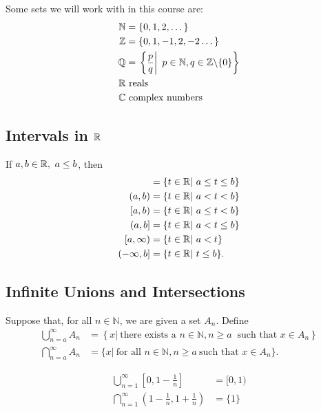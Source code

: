 Some sets we will work with in this course are:
\begin{align*}
\mathbb N & = \{0, 1, 2, \dots \} \\
\mathbb Z & = \{0, 1, -1, 2, -2 \dots \} \\
\mathbb Q & = \left. \left\{ \frac p q \right| ~ p \in \mathbb N, q \in \mathbb Z \backslash \{0\} \right\} \\
\mathbb R & ~\text{reals} \\
\mathbb C & ~\text{complex numbers}
\end{align*}


\subsection{Intervals in $\mathbb R$}
\begin{df}
If $a,b \in \mathbb R, ~a \le b$, then
\begin{align*}
[a,b] & = \{ t \in \R| ~a \le t \le b \} \\
(a,b) & = \{ t \in \R| ~a < t < b \} \\
[a,b) & = \{ t \in \R| ~a \le t < b \} \\
(a,b] & = \{ t \in \R| ~a < t \le b \} \\
[a, \infty) & = \{ t \in \R| ~a < t \} \\
( -\infty ,b] & = \{ t \in \R| ~t \le b \}.
\end{align*}
\end{df}


\subsection{Infinite Unions and Intersections}
\begin{df}
Suppose that, for all $n \in \mathbb N$, we are given a set $A_n$. Define
\begin{align*}
\bigcup_{n=a}^\infty A_n & = \left\{ x | ~\text{there exists a }n\in \mathbb N, n\ge a ~\text{ such that } x \in A_n \right\} \\
\bigcap_{n=a}^\infty A_n & = \{ x | ~\text{for all }n\in \mathbb N, n\ge a ~ \text{such that } x \in A_n \} .
\end{align*}
\end{df}

\begin{ex}
\begin{align*}
\bigcup_{n=1}^\infty \left[0,1-\frac 1 n \right] & = [0,1 ) \\ 
\bigcap_{n=1}^\infty \left(1- \frac 1 n, 1 + \frac 1 n \right) & = \{1\}
\end{align*}
\end{ex}





 
 
 
 
 
 